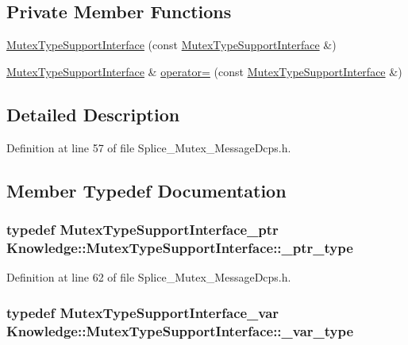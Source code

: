 \subsection*{Private Member Functions}
\begin{DoxyCompactItemize}
\item 
\hyperlink{classKnowledge_1_1MutexTypeSupportInterface_a9e14bb90bd745b93f1929ec9679d06aa}{MutexTypeSupportInterface} (const \hyperlink{classKnowledge_1_1MutexTypeSupportInterface}{MutexTypeSupportInterface} \&)
\item 
\hyperlink{classKnowledge_1_1MutexTypeSupportInterface}{MutexTypeSupportInterface} \& \hyperlink{classKnowledge_1_1MutexTypeSupportInterface_ac77cd0d9239c4bf3973dd51ba90bbde5}{operator=} (const \hyperlink{classKnowledge_1_1MutexTypeSupportInterface}{MutexTypeSupportInterface} \&)
\end{DoxyCompactItemize}


\subsection{Detailed Description}


Definition at line 57 of file Splice\_\-Mutex\_\-MessageDcps.h.



\subsection{Member Typedef Documentation}
\hypertarget{classKnowledge_1_1MutexTypeSupportInterface_a509c42b72d1043ac6b3cdbe678335f6f}{
\subsubsection[{\_\-ptr\_\-type}]{\setlength{\rightskip}{0pt plus 5cm}typedef {\bf MutexTypeSupportInterface\_\-ptr} {\bf Knowledge::MutexTypeSupportInterface::\_\-ptr\_\-type}}}
\label{d4/df0/classKnowledge_1_1MutexTypeSupportInterface_a509c42b72d1043ac6b3cdbe678335f6f}


Definition at line 62 of file Splice\_\-Mutex\_\-MessageDcps.h.

\hypertarget{classKnowledge_1_1MutexTypeSupportInterface_a62ca1346af2778b03bf35651e06ccadf}{
\subsubsection[{\_\-var\_\-type}]{\setlength{\rightskip}{0pt plus 5cm}typedef {\bf MutexTypeSupportInterface\_\-var} {\bf Knowledge::MutexTypeSupportInterface::\_\-var\_\-type}}}
\label{d4/df0/classKnowledge_1_1MutexTypeSupportInterface_a62ca1346af2778b03bf35651e06ccadf}


